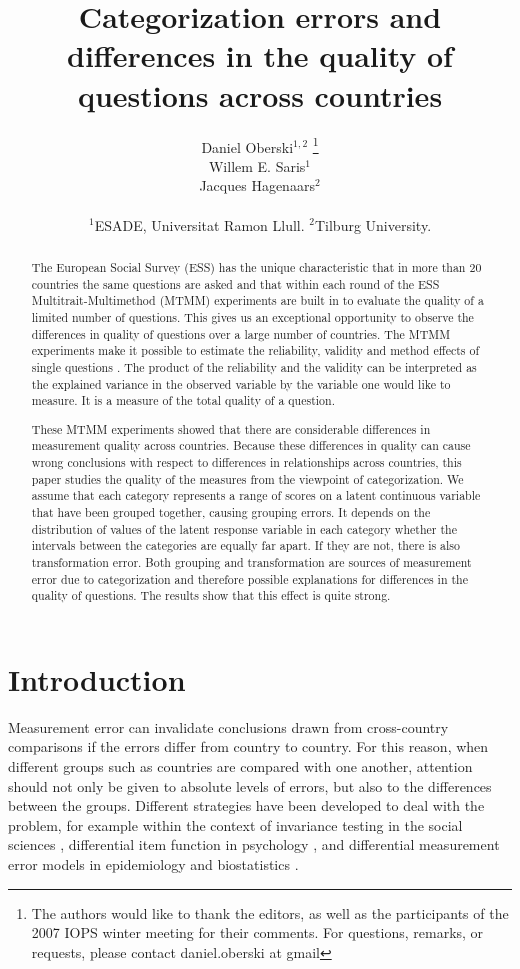 \documentclass[a4paper,12pt]{article}
\author{Daniel Oberski$^{1, 2}$  \thanks{The authors would like to thank the editors, as well as the participants of the 2007 IOPS winter meeting for their comments. For questions, remarks, or requests, please contact daniel.oberski at gmail}\\Willem E. Saris$^{1}$\\
Jacques Hagenaars$^{2}$\\\\
 $^{1}$ESADE, Universitat Ramon Llull. $^{2}$Tilburg University.}
\title{Categorization errors and differences in the quality of questions across countries}
\begin{document}
\maketitle
\begin{abstract}
The European Social Survey (ESS) has the unique characteristic that in more than 20 countries the same questions are asked and that within each round of the ESS Multitrait-Multimethod (MTMM) experiments are built in to evaluate the quality of a limited number of questions. This gives us an exceptional opportunity to observe the differences in quality of questions over a large number of countries. The MTMM experiments make it possible to estimate the reliability, validity and method effects of single questions \citep{andrews_construct_1984,saris_new_2004,saris_evaluation_1991}. The product of the reliability and the validity can be interpreted as the explained variance in the observed variable by the variable one would like to measure. It is a measure of the total quality of a question.

These MTMM experiments showed that there are considerable differences in measurement quality across countries. Because these differences in quality can cause wrong conclusions with respect to differences in relationships across countries,  this paper studies the quality of the measures from the viewpoint of categorization. We assume that each category represents a range of scores on a latent continuous variable that have been grouped together, causing grouping errors. It depends on the distribution of values of the latent response variable in each category whether the intervals between the categories are equally far apart. If they are not, there is also transformation error. Both grouping and transformation are sources of measurement error due to categorization and therefore possible explanations for differences in the quality of questions. The results show that this effect is quite strong.
\end{abstract}\newpage

\section*{Introduction}

Measurement error can invalidate conclusions drawn from cross-country comparisons if the errors differ from country to country. For this reason, when different groups such as countries are compared with one another, attention should not only be given to absolute levels of errors, but also to the differences between the groups. Different strategies have been developed to deal with the problem, for example within the context of invariance testing in the social sciences \citep{joreskog_simultaneous_1971}, differential item function in psychology \citep{muthen_multiple_1985}, and differential measurement error models in epidemiology and biostatistics \citep{carroll_nonlinear_1995}.
\end{document}
